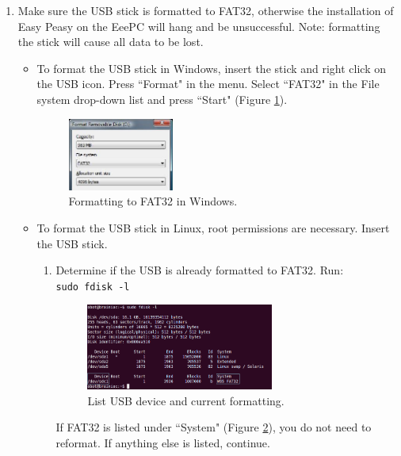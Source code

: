 \begin{enumerate}
\item Make sure the USB stick is formatted to FAT32, otherwise the installation of Easy Peasy on the EeePC will hang and be unsuccessful. Note: formatting the stick will cause all data to be lost.

\begin{itemize}
\item To format the USB stick in Windows, insert the stick and right click on the USB icon. Press ``Format" in the menu. Select ``FAT32" in the File system drop-down list and press ``Start" (Figure \ref{fig:2_fat32}).

\begin{figure}[!h]
\centering
\includegraphics[width=0.35\textwidth]{figures/2_fat32.jpg}
\caption{Formatting to FAT32 in Windows.}
\label{fig:2_fat32}
\end{figure}

\item To format the USB stick in Linux, root permissions are necessary. Insert the USB stick.

\begin{enumerate}

\item Determine if the USB is already formatted to FAT32. Run: \\
\texttt{sudo fdisk -l}

\begin{figure}[!h]
\centering
\includegraphics[width=0.66\textwidth]{figures/2_fat32_ok.png}
\caption{List USB device and current formatting.}
\label{fig:2_fat32_ok}
\end{figure}

If FAT32 is listed under ``System" (Figure \ref{fig:2_fat32_ok}), you do not need to reformat. If anything else is listed, continue.


\end{enumerate}
\end{itemize}
\end{enumerate}
